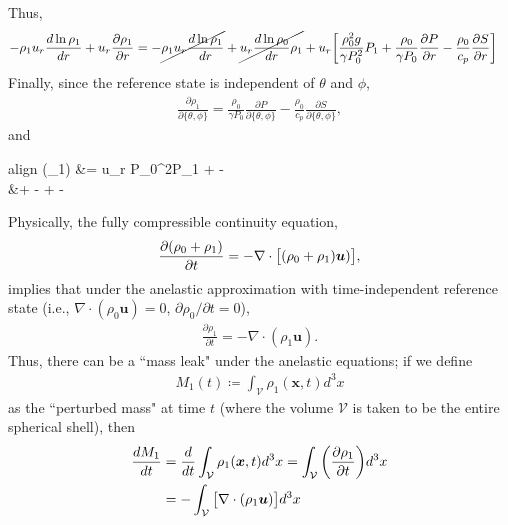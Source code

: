 \documentclass[12pt]{article} %
\newcommand{\pderiv}[2]{\frac{\partial#1}{\partial#2}}
\begin{document}
	Thus,
	\begin{align}
	-\rho_1u_r\frac{d\ln{\rho_1}}{dr} + u_r\pderiv{\rho_1}{r} &= -\cancel{\rho_1u_r\frac{d\ln{\rho_1}}{dr}} +\cancel{u_r\frac{d\ln{\rho_0}}{dr}\rho_1} + u_r\bigg{[}\frac{\rho_0^2g}
	{\gamma P_0^2}P_1 + \frac{\rho_0}{\gamma P_0}
	\pderiv{P}{r} - \frac{\rho_0}{c_p}\pderiv{S}{r}\bigg{]}
	\end{align}
	Finally, since the reference state is independent of $\theta$ and $\phi$, 
	\begin{align}
	\pderiv{\rho_1}{\{\theta,\phi\}} = \frac{\rho_0}{\gamma P_0}\pderiv{P}{\{\theta,\phi\}} - \frac{\rho_0}{c_p}\pderiv{S}{\{\theta,\phi\}},
	\end{align}
	and
	\begin{empheq}[box=\fbox]{align}	
	\nabla\cdot(\rho_1) &= u_r\bigg{[}
		{\gamma P_0^2}P_1 + 
		\pderiv{P_1}{r} - \pderiv{S_1}{r}\bigg{]} \nonumber\\
		&+ 
	\bigg{[}\pderiv{P_1}{\theta} - \pderiv{S_1}{\theta}\bigg{]} + 
\bigg{[}\pderiv{P_1}{\phi} - \pderiv{S_1}{\phi}\bigg{]}
\label{eq:divu_pert}
	\end{empheq}
	Physically, the fully compressible continuity equation,
	\begin{align}
	\pderiv{(\rho_0+\rho_1)}{t} = -\nabla\cdot\big{[}(\rho_0+\rho_1)\bm{u})\big{]},
	\end{align}
	implies that under the anelastic approximation with time-independent reference state (i.e., $\nabla\cdot{(\rho_0\bm{u})}=0$, $\partial\rho_0/\partial t=0$), 
	\begin{align}
	\pderiv{\rho_1}{t} = -\nabla\cdot(\rho_1\bm{u}).
	\label{eq:cont_pert}
	\end{align}
	Thus, there can be a ``mass leak" under the anelastic equations; if we define
	\begin{align}
	M_1(t)\coloneqq \int_\mathcal{V}\rho_1(\bm{x},t)d^3x
	\end{align}
	as the ``perturbed mass" at time $t$ (where the volume $\mathcal{V}$ is taken to be the entire spherical shell), then
	\begin{align}
	\frac{dM_1}{dt} &= \frac{d}{dt} \int_\mathcal{V}\rho_1(\bm{x},t)d^3x
	= \int_\mathcal{V}\bigg{(}\pderiv{\rho_1}{t}\bigg{)}d^3x\nonumber\\
	&= -\int_\mathcal{V} \big{[}\nabla\cdot(\rho_1\bm{u})\big{]}d^3x
	\end{align}
\end{document}
